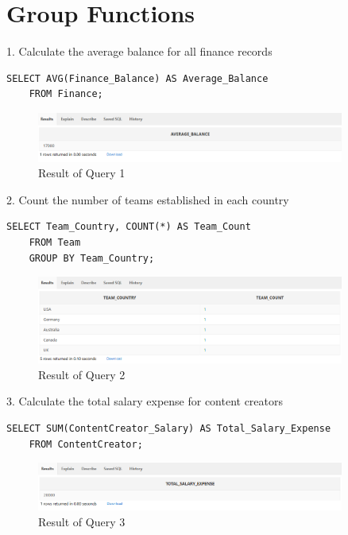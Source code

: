 \clearpage
\section{Group Functions}
\hrulefill

1. Calculate the average balance for all finance records

\begin{lstlisting}[caption={ Query 1},label={lst:q-1}]
    SELECT AVG(Finance_Balance) AS Average_Balance
    FROM Finance;
\end{lstlisting}
\begin{figure}[H]
    \centering
    \includegraphics[width=0.9\textwidth]{images/dml/GroupFun/Q1.png}
    \caption{Result of Query 1}
    \label{fig:Result of Query 1}
\end{figure}
2. Count the number of teams established in each country


\begin{lstlisting}[caption={ Query 2},label={lst:q-2}]
    SELECT Team_Country, COUNT(*) AS Team_Count
    FROM Team
    GROUP BY Team_Country;
\end{lstlisting}

\begin{figure}[H]
    \centering
    \includegraphics[width=0.9\textwidth]{images/dml/GroupFun/Q2.png}
    \caption{Result of Query 2}
    \label{fig:Result of Query 2}
\end{figure}

3. Calculate the total salary expense for content creators

\begin{lstlisting}[caption={ Query 3},label={lst:q-3}]
    SELECT SUM(ContentCreator_Salary) AS Total_Salary_Expense
    FROM ContentCreator;
\end{lstlisting}
\begin{figure}[H]
    \centering
    \includegraphics[width=0.9\textwidth]{images/dml/GroupFun/Q3.png}
    \caption{Result of Query 3}
    \label{fig:Result of Query 3}
\end{figure}
\clearpage